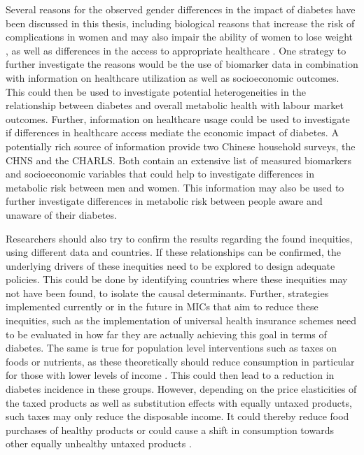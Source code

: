 Several reasons for the observed gender differences in the impact of diabetes have been discussed in this thesis, including biological reasons that increase the risk of complications in women \textcite{Peters2014,Peters2015,Arnetz2014,Roche2013,Policardo2014,Catalan2015,Engelmann2016,Seghieri2015} and may also impair the ability of women to lose weight \parencite{Penno2013}, as well as differences in the access to appropriate healthcare \parencite{Penno2013}. One strategy to further investigate the reasons would be the use of biomarker data in combination with information on healthcare utilization as well as socioeconomic outcomes. This could then be used to investigate potential heterogeneities in the relationship between diabetes and overall metabolic health with labour market outcomes. Further, information on healthcare usage could be used to investigate if differences in healthcare access mediate the economic impact of diabetes. A potentially rich source of information provide two Chinese household surveys, the \acf{CHNS} and the \acf{CHARLS}. Both contain an extensive list of measured biomarkers and socioeconomic variables that could help to investigate differences in metabolic risk between men and women. This information may also be used to further investigate differences in metabolic risk between people aware and unaware of their diabetes.

Researchers should also try to confirm the results regarding the found inequities, using different data and countries. If these relationships can be confirmed, the underlying drivers of these inequities need to be explored to design adequate policies. This could be done by identifying countries where these inequities may not have been found, to isolate the causal determinants. Further, strategies implemented currently or in the future in \acp{MIC} that aim to reduce these inequities, such as the implementation of universal health insurance schemes need to be evaluated in how far they are actually achieving this goal in terms of diabetes. The same is true for population level interventions such as taxes on foods or nutrients, as these theoretically should reduce consumption in particular for those with lower levels of income \parencite{Mytton2012c}. This could then lead to a reduction in diabetes incidence in these groups. However, depending on the price elasticities of the taxed products as well as substitution effects with equally untaxed products, such taxes may only reduce the disposable income. It could thereby reduce food purchases of healthy products or could cause a shift in consumption towards other equally unhealthy untaxed products \parencite{Mytton2012c}.



